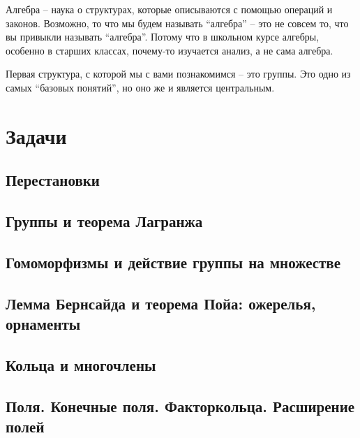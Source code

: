 \documentclass[10pt, twoside]{article}
\begin{document}
\pagestyle{empty}

\newpage

\tableofcontents
\newpage

\setcounter{page}{1}
\pagestyle{fancy}

Алгебра -- наука о структурах, которые описываются с помощью операций и законов. 
Возможно, то что мы будем называть ``алгебра'' -- это не совсем то, что вы привыкли называть ``алгебра''. 
Потому что в школьном курсе алгебры, особенно в старших классах, почему-то изучается анализ, а не сама алгебра.

Первая структура, с которой мы с вами познакомимся -- это группы.
Это одно из самых ``базовых понятий'', но оно же и является центральным. 












\newpage
\renewcommand{\thesubsection}{\roman{subsection}}
\setcounter{subsection}{0}

\section*{Задачи}
\subsection{Перестановки}

\subsection{Группы и теорема Лагранжа}

\subsection{Гомоморфизмы и действие группы на множестве}

\subsection{Лемма Бернсайда и теорема Пойа: ожерелья, орнаменты}
%
\subsection{Кольца и многочлены}
%
\subsection{Поля. Конечные поля. Факторкольца. Расширение полей} %
%
%
\end{document}

